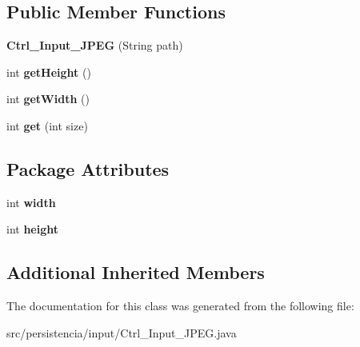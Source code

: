 \subsection*{Public Member Functions}
\begin{DoxyCompactItemize}
\item 
\mbox{\label{classpersistencia_1_1input_1_1Ctrl__Input__JPEG_aa7d81dfa6240a7ee82e5188fc2600c58}} 
{\bfseries Ctrl\+\_\+\+Input\+\_\+\+J\+P\+EG} (String path)
\item 
\mbox{\label{classpersistencia_1_1input_1_1Ctrl__Input__JPEG_a16212709871daadfd0ddf345f84627af}} 
int {\bfseries get\+Height} ()
\item 
\mbox{\label{classpersistencia_1_1input_1_1Ctrl__Input__JPEG_ad9b46004c4c9a2b425fbc84fe1207aea}} 
int {\bfseries get\+Width} ()
\item 
\mbox{\label{classpersistencia_1_1input_1_1Ctrl__Input__JPEG_a3894c1b536caad56b58e993ad5db6b11}} 
int {\bfseries get} (int size)
\end{DoxyCompactItemize}
\subsection*{Package Attributes}
\begin{DoxyCompactItemize}
\item 
\mbox{\label{classpersistencia_1_1input_1_1Ctrl__Input__JPEG_a07d902b25b54941dc0444398c7d380e7}} 
int {\bfseries width}
\item 
\mbox{\label{classpersistencia_1_1input_1_1Ctrl__Input__JPEG_a9e6805b998e58981f8cd7b8b6e609f27}} 
int {\bfseries height}
\end{DoxyCompactItemize}
\subsection*{Additional Inherited Members}


The documentation for this class was generated from the following file\+:\begin{DoxyCompactItemize}
\item 
src/persistencia/input/Ctrl\+\_\+\+Input\+\_\+\+J\+P\+E\+G.\+java\end{DoxyCompactItemize}
